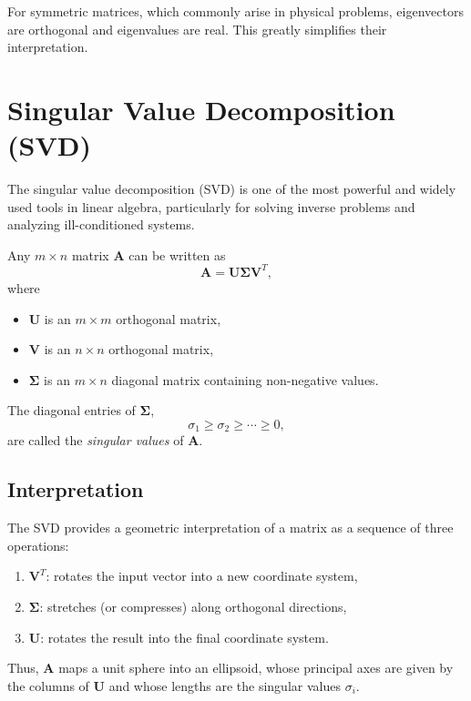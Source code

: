 For symmetric matrices, which commonly arise in physical problems, eigenvectors
are orthogonal and eigenvalues are real. This greatly simplifies their
interpretation.

\section{Singular Value Decomposition (SVD)}

The singular value decomposition (SVD) is one of the most powerful and widely
used tools in linear algebra, particularly for solving inverse problems and
analyzing ill-conditioned systems.

Any $m \times n$ matrix $\mathbf{A}$ can be written as
\begin{equation}
    \mathbf{A} = \mathbf{U} \boldsymbol{\Sigma} \mathbf{V}^T,
\end{equation}
where
\begin{itemize}
    \item $\mathbf{U}$ is an $m \times m$ orthogonal matrix,
    \item $\mathbf{V}$ is an $n \times n$ orthogonal matrix,
    \item $\boldsymbol{\Sigma}$ is an $m \times n$ diagonal matrix containing
    non-negative values.
\end{itemize}

The diagonal entries of $\boldsymbol{\Sigma}$,
\begin{equation}
    \sigma_1 \geq \sigma_2 \geq \cdots \geq 0,
\end{equation}
are called the \emph{singular values} of $\mathbf{A}$.

\subsection*{Interpretation}

The SVD provides a geometric interpretation of a matrix as a sequence of three
operations:
\begin{enumerate}
    \item $\mathbf{V}^T$: rotates the input vector into a new coordinate system,
    \item $\boldsymbol{\Sigma}$: stretches (or compresses) along orthogonal
    directions,
    \item $\mathbf{U}$: rotates the result into the final coordinate system.
\end{enumerate}

Thus, $\mathbf{A}$ maps a unit sphere into an ellipsoid, whose principal axes
are given by the columns of $\mathbf{U}$ and whose lengths are the singular
values $\sigma_i$.

